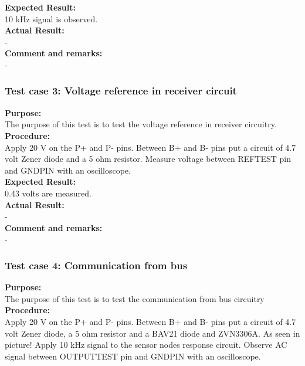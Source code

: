 \textbf{Expected Result:}\\
10 kHz signal is observed.\\

\textbf{Actual Result:}\\
-\\

\textbf{Comment and remarks:}\\
-\\

\subsubsection{Test case 3: Voltage reference in receiver circuit}
\textbf{Purpose:}\\
The purpose of this test is to test the voltage reference in receiver circuitry.\\

\textbf{Procedure:}\\
Apply 20 V on the P+ and P- pins. Between B+ and B- pins put a circuit of 4.7 volt Zener diode and a 5 ohm resistor. Measure voltage between REFTEST pin and GNDPIN with an oscilloscope.\\

\textbf{Expected Result:}\\
0.43 volts are measured.\\

\textbf{Actual Result:}\\
-\\

\textbf{Comment and remarks:}\\
-\\

\subsubsection{Test case 4: Communication from bus}
\textbf{Purpose:}\\
The purpose of this test is to test the communication from bus circuitry\\

\textbf{Procedure:}\\
Apply 20 V on the P+ and P- pins. Between B+ and B- pins put a circuit of 4.7 volt Zener diode, a 5 ohm resistor and a BAV21 diode and ZVN3306A. As seen in picture!  Apply 10 kHz signal to the sensor nodes response circuit. Observe AC signal between OUTPUTTEST pin and GNDPIN with an oscilloscope.\\

